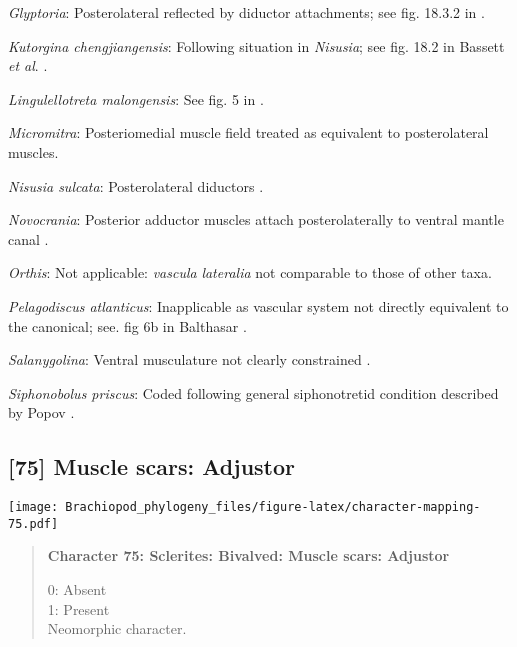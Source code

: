 \documentclass[openany]{book}
\theoremstyle{definition}
\theoremstyle{definition}
\theoremstyle{definition}
\theoremstyle{remark}
\begin{document}
\hypertarget{Glyptoria-coding-74}{}
\emph{Glyptoria}: Posterolateral reflected by diductor attachments; see
fig. 18.3.2 in \citet{Bassett2001Functionalmorphology}.

\hypertarget{Kutorgina_chengjiangensis-coding-74}{}
\emph{Kutorgina chengjiangensis}: Following situation in \emph{Nisusia};
see fig. 18.2 in Bassett \emph{et al}.
\citeyearpar{Bassett2001Functionalmorphology}.

\hypertarget{Lingulellotreta_malongensis-coding-74}{}
\emph{Lingulellotreta malongensis}: See fig. 5 in
\citet{Holmer1997EarlyCambrian}.

\hypertarget{Micromitra-coding-74}{}
\emph{Micromitra}: Posteriomedial muscle field \citep[text-fig.
6]{Williams1998Thediversity} treated as equivalent to posterolateral
muscles.

\hypertarget{Nisusia_sulcata-coding-74}{}
\emph{Nisusia sulcata}: Posterolateral diductors \citep[fig. 18.2
in][]{Bassett2001Functionalmorphology}.

\hypertarget{Novocrania-coding-74}{}
\emph{Novocrania}: Posterior adductor muscles attach posterolaterally to
ventral mantle canal \citep{Robinson2014Themuscles}.

\hypertarget{Orthis-coding-74}{}
\emph{Orthis}: Not applicable: \emph{vascula} \emph{lateralia} not
comparable to those of other taxa.

\hypertarget{Pelagodiscus_atlanticus-coding-74}{}
\emph{Pelagodiscus atlanticus}: Inapplicable as vascular system not
directly equivalent to the canonical; see. fig 6b in Balthasar
\citeyearpar{Balthasar2009Thebrachiopod}.

\hypertarget{Salanygolina-coding-74}{}
\emph{Salanygolina}: Ventral musculature not clearly constrained
\citep{Holmer2009Theenigmatic}.

\hypertarget{Siphonobolus_priscus-coding-74}{}
\emph{Siphonobolus priscus}: Coded following general siphonotretid
condition described by Popov \citeyearpar[p.~407]{Popov1992TheCambrian}.

\subsection*{{[}75{]} Muscle scars:
Adjustor}\label{muscle-scars-adjustor}

\texttt{[image: Brachiopod\_phylogeny\_files/figure-latex/character-mapping-75.pdf]}

\begin{quote}
\textbf{Character 75: Sclerites: Bivalved: Muscle scars: Adjustor}

0: Absent\\
1: Present\\
Neomorphic character.
\end{quote}
\end{document}

